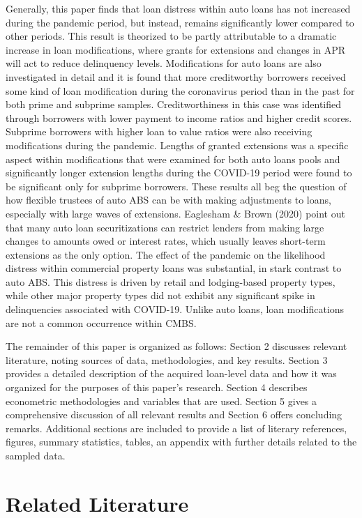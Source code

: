 \documentclass[10.5pt]{article}
\begin{document}
Generally, this paper finds that loan distress within auto loans has not increased during the pandemic period, but instead, remains significantly lower compared to other periods. This result is theorized to be partly attributable to a dramatic increase in loan modifications, where grants for extensions and changes in APR will act to reduce delinquency levels. Modifications for auto loans are also investigated in detail and it is found that more creditworthy borrowers received some kind of loan modification during the coronavirus period than in the past for both prime and subprime samples. Creditworthiness in this case was identified through borrowers with lower payment to income ratios and higher credit scores. Subprime borrowers with higher loan to value ratios were also receiving modifications during the pandemic. Lengths of granted extensions was a specific aspect within modifications that were examined for both auto loans pools and significantly longer extension lengths during the COVID-19 period were found to be significant only for subprime borrowers. These results all beg the question of how flexible trustees of auto ABS can be with making adjustments to loans, especially with large waves of extensions. Eaglesham \& Brown (2020) point out that many auto loan securitizations can restrict lenders from making large changes to amounts owed or interest rates, which usually leaves short-term extensions as the only option. The effect of the pandemic on the likelihood distress within commercial property loans was substantial, in stark contrast to auto ABS. This distress is driven by retail and lodging-based property types, while other major property types did not exhibit any significant spike in delinquencies associated with COVID-19. Unlike auto loans, loan modifications are not a common occurrence within CMBS.

The remainder of this paper is organized as follows: Section 2 discusses relevant literature, noting sources of data, methodologies, and key results. Section 3 provides a detailed description of the acquired loan-level data and how it was organized for the purposes of this paper's research. Section 4 describes econometric methodologies and variables that are used. Section 5 gives a comprehensive discussion of all relevant results and Section 6 offers concluding remarks. Additional sections are included to provide a list of literary references, figures, summary statistics, tables, an appendix with further details related to the sampled data.   

\section{Related Literature}
\end{document}
